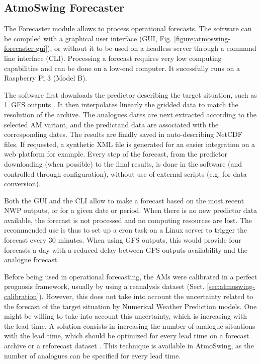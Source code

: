 \documentclass[review]{elsarticle}
\begin{document}
\subsection{AtmoSwing Forecaster}
\label{sec:forecaster}

The Forecaster module allows to process operational forecasts. The software can be compiled with a graphical user interface (GUI, Fig. \ref{figure:atmoswing-forecaster-gui}), or without it to be used on a headless server through a command line interface (CLI). Processing a forecast requires very low computing capabilities and can be done on a low-end computer. It sucessfully runs on a Raspberry Pi 3 (Model B).

The software first downloads the predictor describing the target situation, such as 1\degree\ GFS outputs \citep[Global Forecast System,][see Sect. \ref{sec:data}]{Kanamitsu1991,Kanamitsu1989}. It then interpolates linearly the gridded data to match the resolution of the archive. The analogues dates are next extracted according to the selected AM variant, and the predictand data are associated with the corresponding dates. The results are finally saved in auto-describing NetCDF files. If requested, a synthetic XML file is generated for an easier integration on a web platform for example. Every step of the forecast, from the predictor downloading (when possible) to the final results, is done in the software (and controlled through configuration), without use of external scripts (e.g. for data conversion).

Both the GUI and the CLI allow to make a forecast based on the most recent NWP outputs, or for a given date or period. When there is no new predictor data available, the forecast is not processed and no computing resources are lost. The recommended use is thus to set up a cron task on a Linux server to trigger the forecast every 30 minutes. When using GFS outputs, this would provide four forecasts a day with a reduced delay between GFS outputs availability and the analogue forecast.

Before being used in operational forecasting, the AMs were calibrated in a perfect prognosis framework, usually by using a reanalysis dataset (Sect. \ref{sec:atmoswing-calibration}). However, this does not take into account the uncertainty related to the forecast of the target situation by Numerical Weather Prediction models. One might be willing to take into account this uncertainty, which is increasing with the lead time. A solution consists in increasing the number of analogue situations with the lead time, which should be optimized for every lead time on a forecast archive or a reforecast dataset \citep{Thevenot2004}. This technique is available in AtmoSwing, as the number of analogues can be specified for every lead time.
\end{document}
